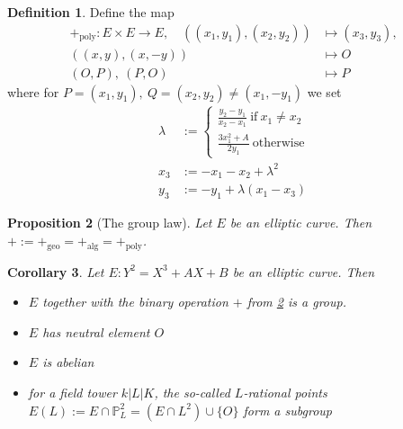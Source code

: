 \documentclass{scrartcl}
\newcommand{\Proj}{\mathbb{P}}
\renewcommand{\O}{O}
\newtheorem{prop}{Proposition}[section]
\newtheorem{corollary}[prop]{Corollary}
\theoremstyle{definition}
\newtheorem{definition}[prop]{Definition}
\begin{document}
\begin{definition}
    Define the map 
    \begin{align*}
        +_{\mathrm{poly}}: E \times E \to E, \quad ((x_1, y_1), (x_2, y_2)) &\mapsto (x_3, y_3), \\
        ((x, y), (x, -y)) &\mapsto \O \\
        (\O, P), \ (P, \O) &\mapsto P
    \end{align*}
    where for $P = (x_1, y_1), \ Q = (x_2, y_2) \neq (x_1, -y_1)$ we set
    \begin{align*}
        \lambda &:= \begin{cases}
            \frac {y_2 - y_1} {x_2 - x_1} \ \text{if} \ x_1 \neq x_2 \\
            \frac {3 x_1^2 + A} {2 y_1} \ \text{otherwise}
        \end{cases} \\
        x_3 &:= -x_1 - x_2 + \lambda^2 \\
        y_3 &:= -y_1 + \lambda (x_1 - x_3)
    \end{align*}
\end{definition}

\begin{prop}[The group law]
    \label{prop:group_operation}
    Let $E$ be an elliptic curve. Then $+ := +_{\mathrm{geo}} = +_{\mathrm{alg}} = +_{\mathrm{poly}}$.
\end{prop}

\begin{corollary}
    Let $E: Y^2 = X^3 + AX + B$ be an elliptic curve. Then 
    \begin{itemize}
        \item $E$ together with the binary operation $+$ from \ref{prop:group_operation} is a group.
        \item $E$ has neutral element $\O$
        \item $E$ is abelian
        \item for a field tower $k|L|K$, the so-called $L$-rational points $E(L) := E \cap \Proj_L^2 = (E \cap L^2) \cup \{ \O \}$ form a subgroup
    \end{itemize}
\end{corollary}
\end{document}
